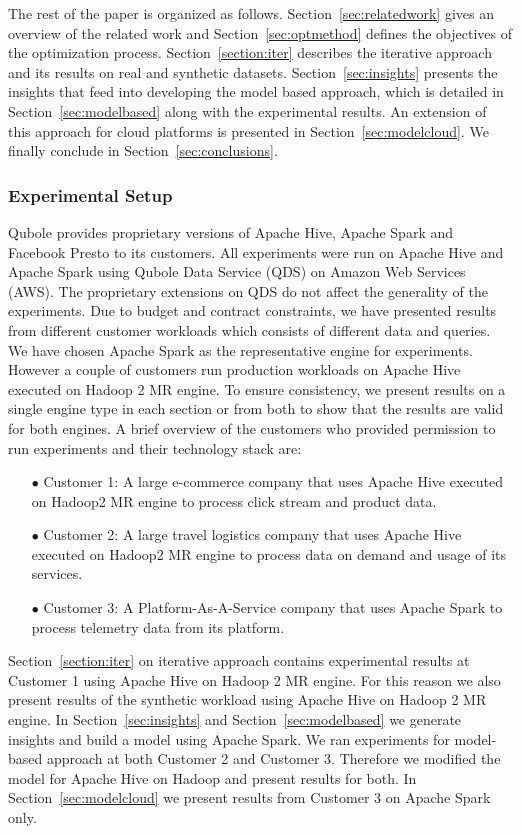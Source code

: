 The rest of the paper is organized as follows. Section~\ref{sec:relatedwork} gives an overview of the related work and Section~\ref{sec:optmethod} defines the objectives of the optimization process. Section~\ref{section:iter} describes the iterative approach and its results on real and synthetic datasets. Section~\ref{sec:insights} presents the insights that feed into developing the model based approach, which is detailed in Section~\ref{sec:modelbased} along with the experimental results. An extension of this approach for cloud platforms is presented in Section~\ref{sec:modelcloud}. We finally conclude in Section~\ref{sec:conclusions}.

\noindent\subsubsection*{Experimental Setup}
Qubole\cite{qubole} provides proprietary versions of Apache Hive\cite{thusoo2009hive}, Apache Spark\cite{zaharia2016apache} and Facebook Presto\cite{presto} to its customers.
All experiments were run on Apache Hive and Apache Spark using Qubole Data Service (QDS) on Amazon Web Services (AWS). 
The proprietary extensions on QDS do not affect the generality of the experiments.  
Due to budget and contract constraints, we have presented results from different customer workloads which consists of different data and queries. 
We have chosen Apache Spark as the representative engine for experiments. However a couple of customers run production workloads on Apache Hive executed on Hadoop 2 MR engine. To ensure consistency, we present results on a single engine type in each section or from both to show that the results are valid for both engines. 
A brief overview of the customers who provided permission to run experiments and their technology stack are:
\begin{enumerate}
	\item[$\bullet$] Customer 1: A large e-commerce company that uses Apache Hive executed on Hadoop2 MR engine to process click stream and product data. 
	\item[$\bullet$] Customer 2: A large travel logistics company that uses Apache Hive executed on Hadoop2 MR engine to process data on demand and usage of its services.
	\item[$\bullet$] Customer 3: A Platform-As-A-Service company that uses Apache Spark to process telemetry data from its platform.
\end{enumerate}

Section~\ref{section:iter} on iterative approach contains experimental results at Customer 1 using Apache Hive on Hadoop 2 MR engine. 
For this reason we also present results of the synthetic workload using Apache Hive on Hadoop 2 MR engine. 
In Section~\ref{sec:insights} and Section~\ref{sec:modelbased} we generate insights and build a model using Apache Spark. 
We ran experiments for model-based approach at both Customer 2 and Customer 3. 
Therefore we modified the model for Apache Hive on Hadoop and present results for both. In Section~\ref{sec:modelcloud} we present results from Customer 3 on Apache Spark only.   
